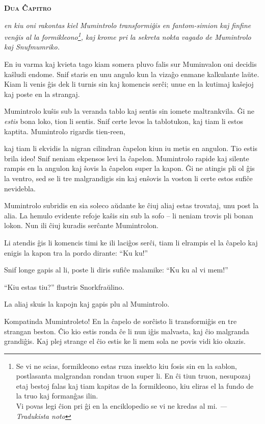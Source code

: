 \begin{center}\textbf{\Large\color{ForestGreen}\textsc{Dua Ĉapitro}}\end{center}

\noindent\textit{en kiu oni rakontas kiel Mumintrolo transformiĝis en fantom-simion kaj finfine venĝis al la formikleono\footnote{Se vi ne scias, formikleono estas ruza insekto kiu fosis sin en la sablon, postlasanta malgrandan rondan truon super li. En ĉi tiun truon, nesupozaj etaj bestoj falas kaj tiam kapitas de la formikleono, kiu eliras el la fundo de la truo kaj formanĝas ilin.\\
Vi povas legi ĉion pri ĝi en la enciklopedio se vi ne kredas al mi. \emph{--- Tradukista noto}}, kaj krome pri la sekreta nokta vagado de Mumintrolo kaj Snufmumriko.}
\hfill \break
\hypertarget{Dua Ĉapitro}{}
\label{Dua Ĉapitro}


\noindent En iu varma kaj kvieta tago kiam somera pluvo falis sur Muminvalon oni decidis kaŝludi endome. Snif staris en unu angulo kun la vizaĝo enmane kalkulante laŭte. Kiam li venis ĝis dek li turnis sin kaj komencis serĉi; unue en la kutimaj kaŝejoj kaj poste en la strangaj.

Mumintrolo kuŝis sub la veranda tablo kaj sentis sin iomete maltrankvila. Ĝi ne \emph{estis} bona loko, tion li sentis. Snif certe levos la tablotukon, kaj tiam li estos kaptita. Mumintrolo rigardis tien-reen,

kaj tiam li ekvidis la nigran cilindran ĉapelon kiun iu metis en angulon. Tio estis brila ideo! Snif neniam ekpensos levi la ĉapelon. Mumintrolo rapide kaj silente rampis en la angulon kaj ŝovis la ĉapelon super la kapon. Ĝi ne atingis pli ol ĝis la ventro, sed se li tre malgrandigis sin kaj enŝovis la voston li certe estos sufiĉe nevidebla.

Mumintrolo subridis en sia soleco aŭdante ke ĉiuj aliaj estas trovataj, unu post la alia. La hemulo evidente refoje kaŝis sin sub la sofo -- li neniam trovis pli bonan lokon. Nun ili ĉiuj kuradis serĉante Mumintrolon.

Li atendis ĝis li komencis timi ke ili laciĝos serĉi, tiam li elrampis el la ĉapelo kaj enigis la kapon tra la pordo dirante: ``Ku ku!''

Snif longe gapis al li, poste li diris sufiĉe malamike: ``Ku ku al vi mem!''

``Kiu estas tiu?'' flustris Snorkfraŭlino.

La aliaj skuis la kapojn kaj gapis plu al Mumintrolo.

Kompatinda Mumintroleto! En la ĉapelo de sorĉisto li transformiĝis en tre strangan beston. Ĉio kio estis ronda ĉe li nun iĝis malvasta, kaj ĉio malgranda grandiĝis. Kaj plej strange el ĉio estis ke li mem sola ne povis vidi kio okazis.

